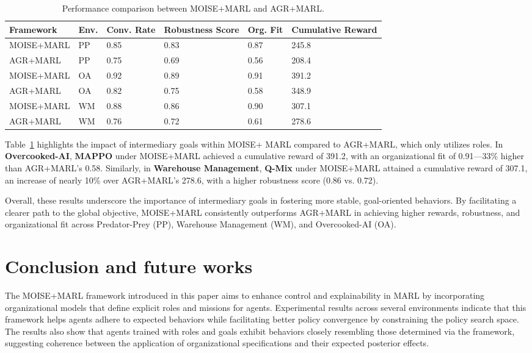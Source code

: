 \documentclass[sigconf,anonymous]{aamas}
\begin{document}
\begin{table}[h!]
    \centering
    \caption{Performance comparison between MOISE+MARL and AGR+MARL.}
    \label{tab:ablation_study}
    \small
    \renewcommand{\arraystretch}{1.1}
    \begin{tabular}{p{1.6cm}p{0.5cm}p{0.6cm}p{1.4cm}p{0.8cm}p{1.3cm}}
        \hline
        \textbf{Framework} & \textbf{Env.} & \textbf{Conv. Rate} & \textbf{Robustness Score} & \textbf{Org. Fit} & \textbf{Cumulative Reward} \\ \hline
        MOISE+MARL & PP & 0.85 & 0.83 & 0.87 & 245.8 \\
        AGR+MARL & PP & 0.75 & 0.69 & 0.56 & 208.4 \\
        MOISE+MARL & OA & 0.92 & 0.89 & 0.91 & 391.2 \\
        AGR+MARL & OA & 0.82 & 0.75 & 0.58 & 348.9 \\
        MOISE+MARL & WM & 0.88 & 0.86 & 0.90 & 307.1 \\
        AGR+MARL & WM & 0.76 & 0.72 & 0.61 & 278.6 \\ \hline
    \end{tabular}
\end{table}

\noindent Table~\ref{tab:ablation_study} highlights the impact of intermediary goals within MOISE+ MARL compared to AGR+MARL, which only utilizes roles. In \textbf{Overcooked-AI}, \textbf{MAPPO} under MOISE+MARL achieved a cumulative reward of 391.2, with an organizational fit of 0.91—33\% higher than AGR+MARL's 0.58. Similarly, in \textbf{Warehouse Management}, \textbf{Q-Mix} under MOISE+MARL attained a cumulative reward of 307.1, an increase of nearly 10\% over AGR+MARL's 278.6, with a higher robustness score (0.86 vs. 0.72).

Overall, these results underscore the importance of intermediary goals in fostering more stable, goal-oriented behaviors. By facilitating a clearer path to the global objective, MOISE+MARL consistently outperforms AGR+MARL in achieving higher rewards, robustness, and organizational fit across Predator-Prey (PP), Warehouse Management (WM), and Overcooked-AI (OA).


\section{Conclusion and future works}
\label{sec:discussion_conclusion_future_work}

The MOISE+MARL framework introduced in this paper aims to enhance control and explainability in MARL by incorporating organizational models that define explicit roles and missions for agents. Experimental results across several environments indicate that this framework helps agents adhere to expected behaviors while facilitating better policy convergence by constraining the policy search space. The results also show that agents trained with roles and goals exhibit behaviors closely resembling those determined via the framework, suggesting coherence between the application of organizational specifications and their expected posterior effects.
\end{document}
